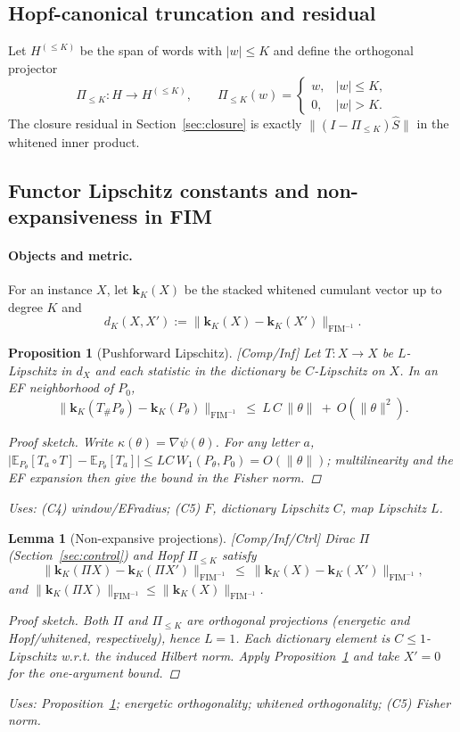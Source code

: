 \documentclass[10pt]{article}
\newcommand{\FIM}{\mathrm{FIM}}
\newcommand{\uses}[1]{\par\smallskip\noindent\textit{Uses: }#1\par\smallskip}
\newenvironment{proofsketch}{\begin{proof}[Proof sketch]}{\end{proof}}
\newtheorem{lemma}{Lemma}
\newtheorem{proposition}{Proposition}
\begin{document}
\subsection{Hopf-canonical truncation and residual}
Let $H^{(\le K)}$ be the span of words with $|w|\le K$ and define the orthogonal projector
\[
\Pi_{\le K}:H\to H^{(\le K)},\qquad \Pi_{\le K}(w)=\begin{cases}w,&|w|\le K,\\0,&|w|>K.\end{cases}
\]
The closure residual in Section~\ref{sec:closure} is exactly $\|(I-\Pi_{\le K})\hat S\|$ in the whitened inner product.

\subsection{Functor Lipschitz constants and non-expansiveness in FIM}\label{sec:cat}

\paragraph{Objects and metric.}
For an instance $X$, let $\mathbf k_K(X)$ be the stacked whitened cumulant vector up to degree $K$ and
\[
d_K(X,X'):=\|\mathbf k_K(X)-\mathbf k_K(X')\|_{\FIM^{-1}}.
\]

\begin{proposition}[Pushforward Lipschitz]\label{prop:push-Lip}
\emph{[\textup{Comp/Inf}]}
Let $T:X\to X$ be $L$-Lipschitz in $d_X$ and each statistic in the dictionary be $C$-Lipschitz on $X$. In an EF neighborhood of $P_0$,
\[
\|\mathbf k_K(T_\# P_\theta)-\mathbf k_K(P_\theta)\|_{\FIM^{-1}}
\ \le\ L\,C\,\|\theta\|\ +\ O(\|\theta\|^2).
\]
\begin{proofsketch}
Write $\kappa(\theta)=\nabla\psi(\theta)$. For any letter $a$, $\big|\mathbb E_{P_\theta}[T_a\!\circ T]-\mathbb E_{P_\theta}[T_a]\big|\le L C\,W_1(P_\theta,P_0)=O(\|\theta\|)$; multilinearity and the EF expansion then give the bound in the Fisher norm.
\end{proofsketch}
\uses{(C4) window/EFradius; (C5) $F$, dictionary Lipschitz $C$, map Lipschitz $L$.}
\end{proposition}

\begin{lemma}[Non-expansive projections]\label{lem:nonexpansive-12}
\emph{[\textup{Comp/Inf/Ctrl}]}
Dirac $\Pi$ (Section~\ref{sec:control}) and Hopf $\Pi_{\le K}$ satisfy
\[
\|\mathbf k_K(\Pi X)-\mathbf k_K(\Pi X')\|_{\FIM^{-1}}\ \le\ \|\mathbf k_K(X)-\mathbf k_K(X')\|_{\FIM^{-1}},
\]
and $\|\mathbf k_K(\Pi X)\|_{\FIM^{-1}}\le \|\mathbf k_K(X)\|_{\FIM^{-1}}$.
\begin{proofsketch}
Both $\Pi$ and $\Pi_{\le K}$ are orthogonal projections (energetic and Hopf/whitened, respectively), hence $L=1$. Each dictionary element is $C\le 1$-Lipschitz w.r.t. the induced Hilbert norm. Apply Proposition~\ref{prop:push-Lip} and take $X'=0$ for the one-argument bound.
\end{proofsketch}
\uses{Proposition~\ref{prop:push-Lip}; energetic orthogonality; whitened orthogonality; (C5) Fisher norm.}
\end{lemma}
\end{document}
